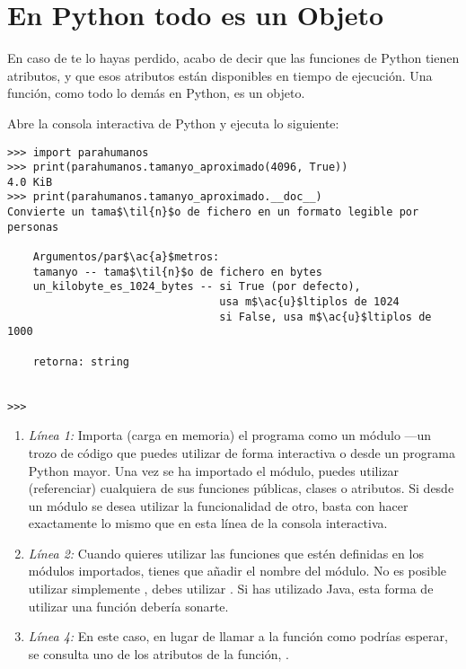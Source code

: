\section{En Python todo es un Objeto}

En caso de te lo hayas perdido, acabo de decir que las funciones de Python tienen atributos, y que esos atributos están disponibles en tiempo de ejecución. Una función, como todo lo demás en Python, es un objeto.

Abre la consola interactiva de Python y ejecuta lo siguiente:

\noindent\begin{minipage}{\textwidth}
\begin{lstlisting}[mathescape=True]
>>> import parahumanos
>>> print(parahumanos.tamanyo_aproximado(4096, True))
4.0 KiB
>>> print(parahumanos.tamanyo_aproximado.__doc__)
Convierte un tama$\til{n}$o de fichero en un formato legible por personas

    Argumentos/par$\ac{a}$metros:
    tamanyo -- tama$\til{n}$o de fichero en bytes
    un_kilobyte_es_1024_bytes -- si True (por defecto), 
                                 usa m$\ac{u}$ltiplos de 1024
                                 si False, usa m$\ac{u}$ltiplos de 1000

    retorna: string

    
>>> 
\end{lstlisting}
\end{minipage}

\begin{enumerate}

\item \emph{Línea 1:} Importa (carga en memoria) el programa  como un módulo ---un trozo de código que puedes utilizar de forma interactiva o desde un programa Python mayor. Una vez se ha importado el módulo, puedes utilizar (referenciar) cualquiera de sus funciones públicas, clases o atributos. Si desde un módulo se desea utilizar la funcionalidad de otro, basta con hacer exactamente lo mismo que en esta línea de la consola interactiva.

\item \emph{Línea 2:} Cuando quieres utilizar las funciones que estén definidas en los módulos importados, tienes que añadir el nombre del módulo. No es posible utilizar simplemente , debes utilizar . Si has utilizado Java, esta forma de utilizar una función debería sonarte.

\item \emph{Línea 4:} En este caso, en lugar de llamar a la función como podrías esperar, se consulta uno de los atributos de la función, .

\end{enumerate}

